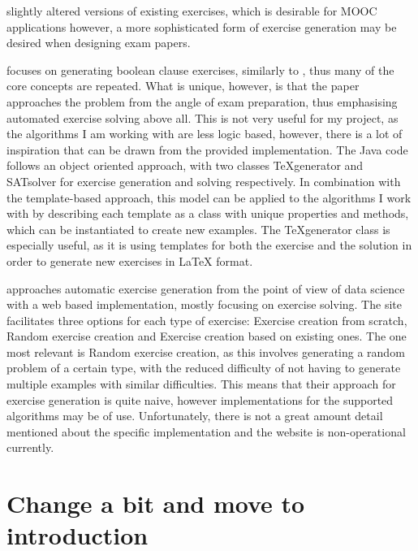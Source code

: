 \documentclass{l4proj}
\begin{document}
slightly altered versions of existing exercises, which is desirable for MOOC applications however, a more sophisticated form of exercise generation may be desired when designing exam papers.

\citet{Esh22} focuses on generating boolean clause exercises, similarly to \citet{Hoz21}, thus many of the core concepts are repeated. What is unique, however, is that the paper approaches the problem from the angle of exam preparation, thus emphasising automated exercise solving above all. This is not very useful for my project, as the algorithms I am working with are less logic based, however, there is a lot of inspiration that can be drawn from the provided implementation. The Java code follows an object oriented approach, with two classes TeXgenerator and SATsolver for exercise generation and solving respectively. In combination with the template-based approach, this model can be applied to the algorithms I work with by describing each template as a class with unique properties and methods, which can be instantiated to create new examples. The TeXgenerator class is especially useful, as it is using templates for both the exercise and the solution in order to generate new exercises in LaTeX format. 

\citet{Kot19} approaches automatic exercise generation from the point of view of data science with a web based implementation, mostly focusing on exercise solving. The site facilitates three options for each type of exercise: Exercise creation from scratch, Random exercise creation and Exercise creation based on existing ones. The one most relevant is Random exercise creation, as this involves generating a random problem of a certain type, with the reduced difficulty of not having to generate multiple examples with similar difficulties. This means that their approach for exercise generation is quite naive, however implementations for the supported algorithms may be of use. Unfortunately, there is not a great amount detail mentioned about the specific implementation and the website is non-operational currently.

\section{Change a bit and move to introduction}
\end{document}
